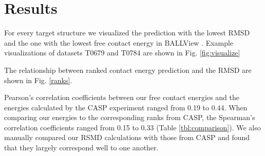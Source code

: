 \documentclass[11pt,a4paper]{article}
\begin{document}
\section{Results}
For every target structure we visualized the prediction with the lowest RMSD and the one with the lowest free contact energy in BALLView \citep{ballview}. Example visualizations of datasets T0679 and T0784 are shown in Fig. \ref{fig:visualize}


The relationship between ranked contact energy prediction and the RMSD are shown in Fig. \ref{ranks}.


Pearson's correlation coefficients between our free contact energies and the energies calculated by the CASP experiment ranged from 0.19 to 0.44. When comparing our energies to the corresponding ranks from CASP, the Spearman's correlation coefficients ranged from 0.15 to 0.33 (Table \ref{tbl:comparison}). We also manually compared our RSMD calculations with those from CASP and found that they largely correspond well to one another.
\end{document}
